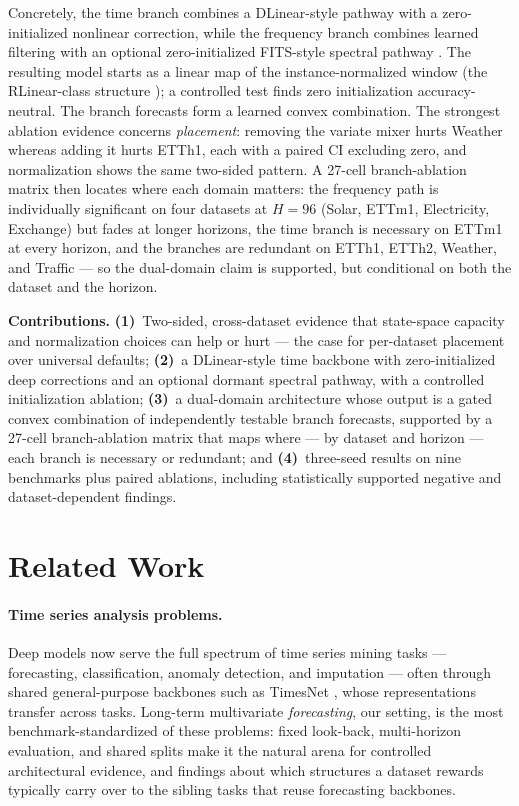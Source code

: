 \documentclass[runningheads]{llncs}
\begin{document}
Concretely, the time branch combines a DLinear-style pathway
\cite{dlinear} with a zero-initialized nonlinear correction, while the
frequency branch combines learned filtering with an optional zero-initialized
FITS-style spectral pathway \cite{fits}. The resulting model starts as a
linear map of the instance-normalized window (the RLinear-class structure
\cite{rlinear,revin}); a controlled test finds zero initialization
accuracy-neutral. The branch forecasts form a learned convex combination.
The strongest ablation evidence concerns \emph{placement}: removing the
variate mixer hurts Weather whereas adding it hurts ETTh1, each with a
paired CI excluding zero, and normalization shows the same two-sided
pattern. A 27-cell branch-ablation matrix then locates where each domain
matters: the frequency path is individually significant on four datasets at
$H{=}96$ (Solar, ETTm1, Electricity, Exchange) but fades at longer
horizons, the time branch is necessary on ETTm1 at every horizon, and the
branches are redundant on ETTh1, ETTh2, Weather, and Traffic --- so the
dual-domain claim is supported, but conditional on both the dataset and the
horizon.

\noindent\textbf{Contributions.} \textbf{(1)}~Two-sided, cross-dataset
evidence that state-space capacity and normalization choices can help or
hurt --- the case for per-dataset placement over universal defaults;
\textbf{(2)}~a DLinear-style time backbone with zero-initialized deep
corrections and an optional dormant spectral pathway, with a controlled
initialization ablation; \textbf{(3)}~a dual-domain architecture whose
output is a gated convex combination of independently testable branch
forecasts, supported by a 27-cell branch-ablation matrix that maps where
--- by dataset and horizon --- each branch is necessary or redundant; and
\textbf{(4)}~three-seed results on nine benchmarks plus paired ablations,
including statistically supported negative and dataset-dependent findings.

\section{Related Work}

\paragraph{Time series analysis problems.} Deep models now serve the full
spectrum of time series mining tasks --- forecasting, classification,
anomaly detection, and imputation --- often through shared general-purpose
backbones such as TimesNet \cite{timesnet}, whose representations transfer
across tasks. Long-term multivariate \emph{forecasting}, our setting, is
the most benchmark-standardized of these problems: fixed look-back,
multi-horizon evaluation, and shared splits \cite{informer,itransformer}
make it the natural arena for controlled architectural evidence, and
findings about which structures a dataset rewards typically carry over to
the sibling tasks that reuse forecasting backbones.
\end{document}
